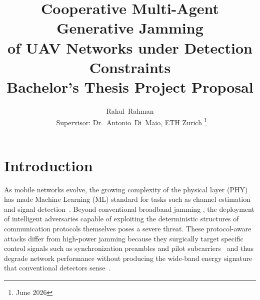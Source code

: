 \documentclass[conference]{IEEEtran}
\title{Cooperative Multi-Agent Generative Jamming\\
of UAV Networks under Detection Constraints\\
\large Bachelor's Thesis Project Proposal}
\author{Rahul~Rahman\\~Supervisor: Dr.~Antonio~Di~Maio, ETH Zurich
\thanks{June 2026}}
\newcommand{\adm}[1]{{\color{orange}{[#1]}}}
\newcommand{\adm}[1]{\ignorespaces}
\begin{document}
\maketitle
\vspace{-2em}

\section{Introduction}
As mobile networks evolve, the growing complexity of the physical layer (PHY) has made Machine Learning (ML) standard for tasks such as channel estimation and signal detection~\cite{pirayesh2022jamming}.
Beyond conventional broadband jamming \adm{cite?}, the deployment of intelligent adversaries capable of exploiting the deterministic structures of communication protocols themselves poses a severe threat.
These protocol-aware attacks differ from high-power jamming because they surgically target specific control signals such as synchronization preambles and pilot subcarriers~\cite{zhang2023detection} and thus degrade network performance without producing the wide-band energy signature that conventional detectors sense~\cite{pirayesh2022jamming}.
\end{document}
